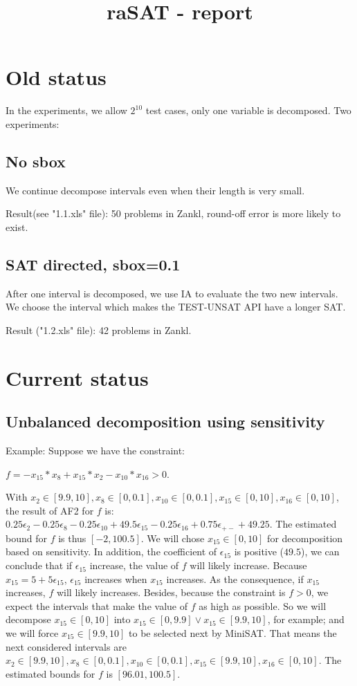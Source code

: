 \documentclass[12pt]{article}
\title{raSAT - report}
\begin{document}
\maketitle
\section{Old status}

In the experiments, we allow $2^{10}$ test cases, only one variable is decomposed. Two experiments:

\subsection{No sbox}
We continue decompose intervals even when their length is very small.

Result(see "1.1.xls" file): 50 problems in Zankl, round-off error is more likely to exist.

\subsection{SAT directed, sbox=0.1}
After one interval is decomposed, we use IA to evaluate the two new intervals. We choose the interval which makes the TEST-UNSAT API have a longer SAT.

Result ("1.2.xls" file): 42 problems in Zankl.

\section{Current status}

\subsection{Unbalanced decomposition using sensitivity}
\label{subsec:unbalanced}
Example: Suppose we have the constraint: 

$f = -x_{15}*x_8+x_{15}*x_2-x_{10}*x_{16}>0$. 

With $x_2 \in [9.9, 10], x_8 \in [0, 0.1], x_{10} \in [0, 0.1], x_{15} \in [0, 10], x_{16} \in [0, 10]$, the result of AF2 for $f$ is: $0.25 \epsilon_2 - 0.25 \epsilon_8 - 0.25 \epsilon_{10} + 49.5\epsilon_{15} - 0.25\epsilon_{16} + 0.75\epsilon_{+-} + 49.25$. The estimated bound for $f$ is thus $[-2, 100.5]$. We will chose $x_{15} \in [0, 10]$ for decomposition based on sensitivity. In addition, the coefficient of $\epsilon_{15}$ is positive ($49.5$), we can conclude that if $\epsilon_{15}$ increase, the value of $f$ will likely increase. Because $x_{15} = 5+5\epsilon_{15}$, $\epsilon_{15}$ increases when $x_{15}$ increases. As the consequence, if $x_{15}$ increases, $f$ will likely increases. Besides, because the constraint is $f>0$, we expect the intervals that make the value of $f$ as high as possible. So we will decompose $x_{15} \in [0, 10]$ into $x_{15} \in [0, 9.9] \lor x_{15} \in [9.9, 10]$, for example; and we will force $x_{15} \in [9.9, 10]$ to be selected next by MiniSAT. That means the next considered intervals are $x_2 \in [9.9, 10], x_8 \in [0, 0.1], x_{10} \in [0, 0.1], x_{15} \in [9.9, 10], x_{16} \in [0, 10]$. The estimated bounds for $f$ is $[96.01, 100.5]$.
\end{document}
